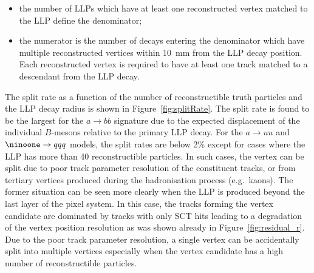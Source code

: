 \documentclass[PUB,UKenglish, texlive=2018]{\ATLASLATEXPATH atlasdoc}
\begin{document}
\begin{itemize}
\item the number of LLPs which have at least one reconstructed vertex matched to the LLP define the denominator;
\item the numerator is the number of decays entering the denominator which have multiple reconstructed vertices within 10~mm from the LLP decay position. 
Each reconstructed vertex is required to have at least one track matched to a descendant from the LLP decay.
\end{itemize}

The split rate as a function of the number of reconstructible truth particles and the LLP decay radius is shown in Figure~\ref{fig:splitRate}.
The split rate is found to be the largest for the $a \rightarrow bb$ signature due to the expected displacement of the individual $B$-mesons relative to the primary LLP decay.
For the $a \rightarrow uu$ and $\ninoone \rightarrow qqq$ models, the split rates are below 2\% except for cases where the LLP has more than 40 reconstructible particles.
In such cases, the vertex can be split due to poor track parameter resolution of the constituent tracks, or from tertiary vertices produced during the hadronisation process (e.g.~kaons).
The former situation can be seen more clearly when the LLP is produced beyond the last layer of the pixel system.
In this case, the tracks forming the vertex candidate are dominated by tracks with only SCT hits leading to a degradation of the vertex position resolution as was shown already in Figure~\ref{fig:residual_r}.
Due to the poor track parameter resolution, a single vertex can be accidentally split into multiple vertices especially when the vertex candidate has a high number of reconstructible particles.
\end{document}
